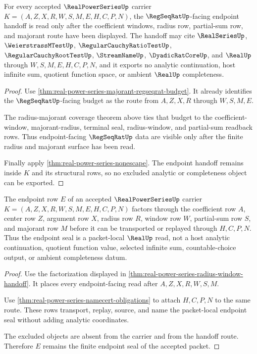 \begin{theorem}
\label{thm:real-power-series-regseqrat-endpoint-handoff}
For every accepted $\RealPowerSeriesUp$ carrier $K=(A,Z,X,R,W,S,M,E,H,C,P,N)$, the $\RegSeqRatUp$-facing endpoint handoff is read only after the coefficient windows, radius row, partial-sum row, and majorant route have been displayed. The handoff may cite $\RealSeriesUp$, $\WeierstrassMTestUp$, $\RegularCauchyRatioTestUp$, $\RegularCauchyRootTestUp$, $\StreamNameUp$, $\DyadicRatCoreUp$, and $\RealUp$ through $W,S,M,E,H,C,P,N$, and it exports no analytic continuation, host infinite sum, quotient function space, or ambient $\RealUp$ completeness.
\end{theorem}
\begin{proof}
Use \autoref{thm:real-power-series-majorant-regseqrat-budget}. It already identifies the $\RegSeqRatUp$-facing budget as the route from $A,Z,X,R$ through $W,S,M,E$.

The radius-majorant coverage theorem above ties that budget to the coefficient-window, majorant-radius, terminal seal, radius-window, and partial-sum readback rows. Thus endpoint-facing $\RegSeqRatUp$ data are visible only after the finite radius and majorant surface has been read.

Finally apply \autoref{thm:real-power-series-nonescape}. The endpoint handoff remains inside $K$ and its structural rows, so no excluded analytic or completeness object can be exported.
\end{proof}

\begin{theorem}\label{thm:real-power-series-endpoint-seal-factorization}
The endpoint row $E$ of an accepted $\RealPowerSeriesUp$ carrier $K=(A,Z,X,R,W,S,M,E,H,C,P,N)$ factors through the coefficient row $A$, center row $Z$, argument row $X$, radius row $R$, window row $W$, partial-sum row $S$, and majorant row $M$ before it can be transported or replayed through $H,C,P,N$. Thus the endpoint seal is a packet-local $\RealUp$ read, not a host analytic continuation, quotient function value, selected infinite sum, countable-choice output, or ambient completeness datum.
\end{theorem}
\begin{proof}
Use the factorization displayed in \autoref{thm:real-power-series-radius-window-handoff}. It places every endpoint-facing read after $A,Z,X,R,W,S,M$.

Use \autoref{thm:real-power-series-namecert-obligations} to attach $H,C,P,N$ to the same route. These rows transport, replay, source, and name the packet-local endpoint seal without adding analytic coordinates.

The excluded objects are absent from the carrier and from the handoff route. Therefore $E$ remains the finite endpoint seal of the accepted packet.
\end{proof}

